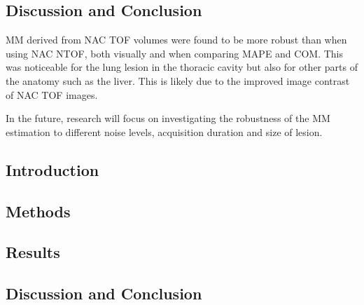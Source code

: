         \subsection{Discussion and Conclusion} \label{sec:impact_of_tof_on_respiratory_motion_modelling_using_nac_pet_discussion_and_conclusion}
            \gls{MM} derived from \gls{NAC} \gls{TOF} volumes were found to be more robust than when using \gls{NAC} \gls{NTOF}, both visually and when comparing \gls{MAPE} and \gls{COM}. This was noticeable for the lung lesion in the thoracic cavity but also for other parts of the anatomy such as the liver. This is likely due to the improved image contrast of \gls{NAC} \gls{TOF} images.

            In the future, research will focus on investigating the robustness of the \gls{MM} estimation to different noise levels, acquisition duration and size of lesion.
    
        
        
        \subsection{Introduction} \label{sec:impact_of_tof_on_respiratory_motion_modelling_using_nac_pet_an_extension_to_inter_and_intra_respiratory_cycle_variation_introduction}
        
        \subsection{Methods} \label{sec:impact_of_tof_on_respiratory_motion_modelling_using_nac_pet_an_extension_to_inter_and_intra_respiratory_cycle_variation_methods}
            
            
        \subsection{Results} \label{sec:impact_of_tof_on_respiratory_motion_modelling_using_nac_pet_an_extension_to_inter_and_intra_respiratory_cycle_variation_results}
            
            
        \subsection{Discussion and Conclusion} \label{sec:impact_of_tof_on_respiratory_motion_modelling_using_nac_pet_an_extension_to_inter_and_intra_respiratory_cycle_variation_discussion_and_conclusion}
            
